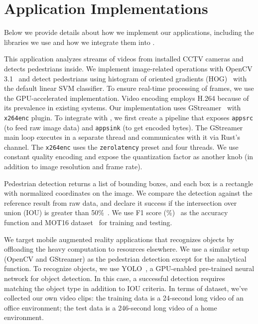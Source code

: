 \section{Application Implementations}
\label{appendix:appl-impl}

Below we provide details about how we implement our applications, including the
libraries we use and how we integrate them into \sysname{}.

 This application analyzes streams of videos from
installed CCTV cameras and detects pedestrians inside. We implement
image-related operations with OpenCV 3.1~\cite{opencvlibrary} and detect
pedestrians using histogram of oriented gradients
(HOG)~\cite{dalal2005histograms} with the default linear SVM classifier. To
ensure real-time processing of frames, we use the GPU-accelerated
implementation. Video encoding employs H.264 because of its prevalence in
existing systems. Our implementation uses GStreamer~\cite{gstreamer} with
\texttt{x264enc} plugin. To integrate with \sysname{}, we first create a
pipeline that exposes \texttt{appsrc} (to feed raw image data) and
\texttt{appsink} (to get encoded bytes). The GStreamer main loop executes in a
separate thread and \sysname{} communicates with it via Rust's channel. The
\texttt{x264enc} uses the \texttt{zerolatency} preset and four threads. We use
constant quality encoding and expose the quantization factor as another knob (in
addition to image resolution and frame rate).

Pedestrian detection returns a list of bounding boxes, and each box is a
rectangle with normalized coordinates on the image. We compare the detection
against the reference result from raw data, and declare it success if the
intersection over union (IOU) is greater than
50\%~\cite{everingham2010pascal}. We use F1 score
(\%)~\cite{Rijsbergen:1979:IR:539927} as the accuracy function and MOT16
dataset~\cite{milan2016mot16} for training and testing.

 We target mobile augmented reality applications that
recognizes objects by offloading the heavy computation to resources elsewhere.
We use a similar setup (OpenCV and GStreamer) as the pedestrian detection except
for the analytical function. To recognize objects, we use YOLO~\cite{darknet13,
redmon2016yolo9000}, a GPU-enabled pre-trained neural network for object
detection. In this case, a successful detection requires matching the object
type in addition to IOU criteria. In terms of dataset, we've collected our own
video clips: the training data is a 24-second long video of an office
environment; the test data is a 246-second long video of a home environment.

